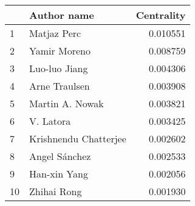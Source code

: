 \begin{tabular}{llr}
\toprule
{} &            Author name &  Centrality \\
\midrule
1 &            Matjaz Perc &    0.010551 \\
2 &           Yamir Moreno &    0.008759 \\
3 &          Luo-luo Jiang &    0.004306 \\
4 &          Arne Traulsen &    0.003908 \\
5 &        Martin A. Nowak &    0.003821 \\
6 &              V. Latora &    0.003425 \\
7 &  Krishnendu Chatterjee &    0.002602 \\
8 &          Angel Sánchez &    0.002533 \\
9 &           Han-xin Yang &    0.002056 \\
10 &            Zhihai Rong &   0.001930 \\
\bottomrule
\end{tabular}

